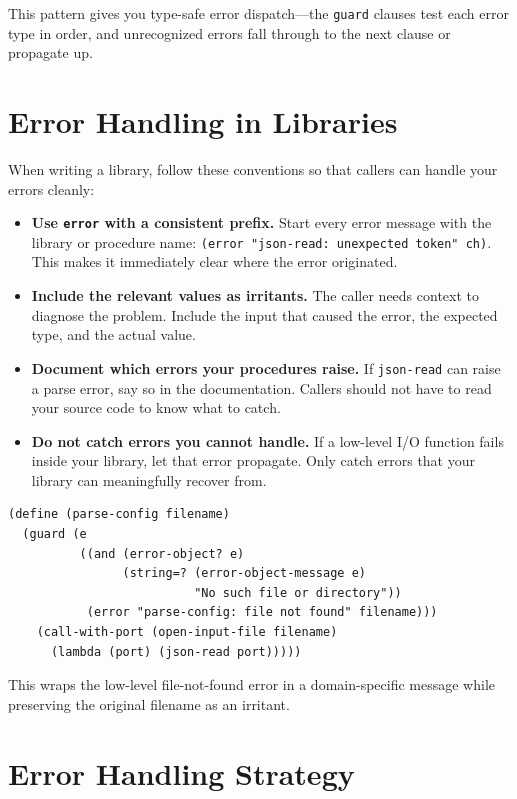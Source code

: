 This pattern gives you type-safe error dispatch---the \texttt{guard} clauses test each error type in order, and unrecognized errors fall through to the next clause or propagate up.

\section{Error Handling in Libraries}

When writing a library, follow these conventions so that callers can handle your errors cleanly:

\begin{itemize}
    \item \textbf{Use \texttt{error} with a consistent prefix.} Start every error message with the library or procedure name: \texttt{(error "json-read: unexpected token" ch)}. This makes it immediately clear where the error originated.
    \item \textbf{Include the relevant values as irritants.} The caller needs context to diagnose the problem. Include the input that caused the error, the expected type, and the actual value.
    \item \textbf{Document which errors your procedures raise.} If \texttt{json-read} can raise a parse error, say so in the documentation. Callers should not have to read your source code to know what to catch.
    \item \textbf{Do not catch errors you cannot handle.} If a low-level I/O function fails inside your library, let that error propagate. Only catch errors that your library can meaningfully recover from.
\end{itemize}

\begin{lstlisting}
(define (parse-config filename)
  (guard (e
          ((and (error-object? e)
                (string=? (error-object-message e)
                          "No such file or directory"))
           (error "parse-config: file not found" filename)))
    (call-with-port (open-input-file filename)
      (lambda (port) (json-read port)))))
\end{lstlisting}

This wraps the low-level file-not-found error in a domain-specific message while preserving the original filename as an irritant.

\section{Error Handling Strategy}

